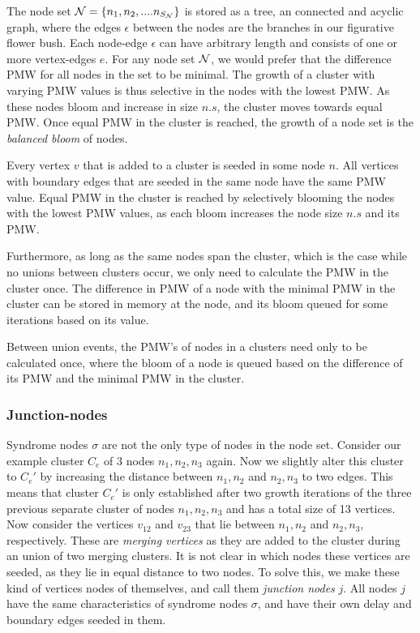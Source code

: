 The node set $\mathcal{N} = \{n_1, n_2, .... n_{S_{\mathcal{N}}}\}$ is stored as a tree, an connected and acyclic graph, where the edges $\epsilon$ between the nodes are the branches in our figurative flower bush. Each node-edge $\epsilon$ can have arbitrary length and consists of one or more vertex-edges $e$. For any node set $\mathcal{N}$, we would prefer that the difference PMW for all nodes in the set to be minimal. The growth of a cluster with varying PMW values is thus selective in the nodes with the lowest PMW. As these nodes bloom and increase in size $n.s$, the cluster moves towards equal PMW. Once equal PMW in the cluster is reached, the growth of a node set is the \emph{balanced bloom} of nodes.

\begin{theorem}\label{th:balancedbloom}
  Every vertex $v$ that is added to a cluster is seeded in some node $n$. All vertices with boundary edges that are seeded in the same node have the same PMW value. Equal PMW in the cluster is reached by selectively blooming the nodes with the lowest PMW values, as each bloom increases the node size $n.s$ and its PMW.
\end{theorem}

Furthermore, as long as the same nodes span the cluster, which is the case while no unions between clusters occur, we only need to calculate the PMW in the cluster once. The difference in PMW of a node with the minimal PMW in the cluster can be stored in memory at the node, and its bloom queued for some iterations based on its value.

\begin{lemma}\label{lem:calconce}
  Between union events, the PMW's of nodes in a clusters need only to be calculated once, where the bloom of a node is queued based on the difference of its PMW and the minimal PMW in the cluster.
\end{lemma}

\subsubsection{Junction-nodes}

Syndrome nodes $\sigma$ are not the only type of nodes in the node set. Consider our example cluster $C_e$ of 3 nodes $n_1, n_2, n_3$ again. Now we slightly alter this cluster to $C_e'$ by increasing the distance between $n_1, n_2$ and $n_2, n_3$ to two edges. This means that cluster $C_e'$ is only established after two growth iterations of the three previous separate cluster of nodes $n_1, n_2, n_3$ and has a total size of 13 vertices. Now consider the vertices $v_{12}$ and $v_{23}$ that lie between $n_1, n_2$ and $n_2, n_3$, respectively. These are \emph{merging vertices} as they are added to the cluster during an union of two merging clusters. It is not clear in which nodes these vertices are seeded, as they lie in equal distance to two nodes. To solve this, we make these kind of vertices nodes of themselves, and call them \emph{junction nodes} $j$. All nodes $j$ have the same characteristics of syndrome nodes $\sigma$, and have their own delay and boundary edges seeded in them.

